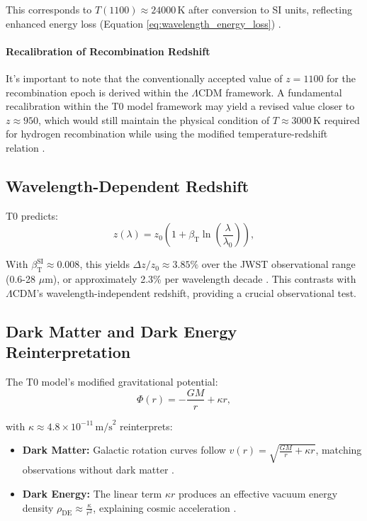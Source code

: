 \documentclass[12pt,a4paper]{article}
\newcommand{\betaT}{\beta_{\text{T}}}
\newcommand{\LCDM}{\Lambda\text{CDM}}
\begin{document}
	This corresponds to \(T(1100) \approx 24000 \, \text{K}\) after conversion to SI units, reflecting enhanced energy loss (Equation \ref{eq:wavelength_energy_loss}) \cite{pascher_temp_2025}. 
	
	\paragraph{Recalibration of Recombination Redshift} It's important to note that the conventionally accepted value of \(z = 1100\) for the recombination epoch is derived within the \(\LCDM\) framework. A fundamental recalibration within the T0 model framework may yield a revised value closer to \(z \approx 950\), which would still maintain the physical condition of \(T \approx 3000 \, \text{K}\) required for hydrogen recombination while using the modified temperature-redshift relation \cite{pascher_temp_2025}.
	
	\subsection{Wavelength-Dependent Redshift}
	\label{subsec:wavelength_redshift}
	
	T0 predicts:
	\begin{equation}
		z(\lambda) = z_0 \left(1 + \betaT \ln\left(\frac{\lambda}{\lambda_0}\right)\right),
		\label{eq:wavelength_redshift}
	\end{equation}
	
	With \(\betaT^{\text{SI}} \approx 0.008\), this yields \(\Delta z / z_0 \approx 3.85\%\) over the JWST observational range (0.6-28 \(\mu\text{m}\)), or approximately 2.3\% per wavelength decade \cite{pascher_params_2025}. This contrasts with \(\LCDM\)'s wavelength-independent redshift, providing a crucial observational test.
	
	\subsection{Dark Matter and Dark Energy Reinterpretation}
	\label{subsec:dark_reinterpretation}
	
	The T0 model's modified gravitational potential:
	\begin{equation}
		\Phi(r) = -\frac{GM}{r} + \kappa r,
		\label{eq:grav_potential_t0}
	\end{equation}
	
	with \(\kappa \approx 4.8 \times 10^{-11} \, \text{m/s}^2\) reinterprets:
	\begin{itemize}
		\item \textbf{Dark Matter:} Galactic rotation curves follow \(v(r) = \sqrt{\frac{GM}{r} + \kappa r}\), matching observations without dark matter \cite{McGaugh2016}.
		\item \textbf{Dark Energy:} The linear term \(\kappa r\) produces an effective vacuum energy density \(\rho_{\text{DE}} \approx \frac{\kappa}{r^2}\), explaining cosmic acceleration \cite{pascher_galaxies_2025}.
	\end{itemize}
	
\end{document}
